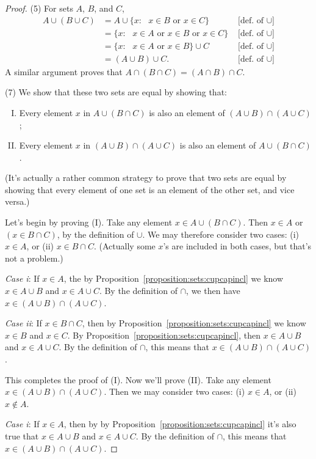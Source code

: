 \begin{proof}
\noindent 
(5)
For sets $A$, $B$, and $C$,
\begin{align*}
A \cup (B \cup C)
& =
A \cup \{ x : \mbox{ $x \in B$ or $x \in C$} \}   &\text{ [def. of } \cup]  \\
& =
\{ x : \mbox{ $x \in A$ or $x \in B$ or $x \in C$} \}    &\text{ [def. of } \cup]  \\
& =
\{ x : \mbox{ $x \in A$ or $x \in B$} \} \cup C    &\text{ [def. of } \cup]  \\
& =
(A \cup B) \cup C.    &\text{ [def. of } \cup] 
\end{align*}
A  similar argument proves that  $A \cap (B \cap C) = (A \cap B) \cap
C$. 

\noindent 
(7)
We show that these two sets are equal by showing that:
\begin{enumerate}[(I)]
\item
Every element $x$ in $A \cup (B \cap C)$ is also an element of $(A \cup B) \cap (A \cup C)$;
\item
Every element $x$ in $(A \cup B) \cap (A \cup C)$ is also an element of $A \cup (B \cap C)$.
\end{enumerate}
(It's actually a rather common strategy to prove that two sets are equal by showing that every element of one set is an element of the other set, and vice versa.)

Let's begin by proving (I). Take any element $x \in A \cup (B \cap C)$.  Then
$x \in A$  or $(x \in B \cap C)$, by the definition of $\cup$. We may therefore consider two cases: (i) $x \in A$, or (ii) $x \in B \cap C$.  (Actually some $x$'s are included in both cases, but that's not a problem.)

\noindent
\emph{Case i}:  If $x \in A$, the by Proposition~\ref{proposition:sets:cupcapincl} we know $x \in A \cup B$ and $x \in A \cup C$. By the definition of $\cap$, we then have   $x \in (A \cup B) \cap (A \cup C)$.

\noindent
\emph{Case ii}:  If $x \in  B  \cap C$, then by Proposition~\ref{proposition:sets:cupcapincl} we know $x \in  B$ and $x \in  C$. 
By Proposition~\ref{proposition:sets:cupcapincl},  then $x \in A \cup  B$ and $x \in A  \cup  C$.  By the definition of $\cap$, this means that $x \in (A \cup  B) \cap (A  \cup  C)$.  

This completes the proof of (I). Now we'll  prove (II). Take any element $x \in (A \cup B) \cap (A \cup C)$.  Then we may consider two cases: 
(i) $x \in A$, or (ii) $x \not\in A$.

\noindent
\emph{Case i}:  If $x \in A$, then by by Proposition~\ref{proposition:sets:cupcapincl} it's also true that $x \in A \cup  B$ and $x \in A \cup  C$.  By the definition of $\cap$, this means that $x \in (A \cup  B) \cap (A  \cup  C)$.  


\end{proof}
